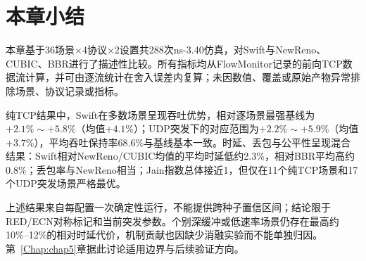 \section{本章小结}

本章基于36场景$\times$4协议$\times$2设置共288次ns-3.40仿真，对Swift与NewReno、CUBIC、BBR进行了描述性比较。所有指标均从FlowMonitor记录的前向TCP数据流计算，并可由逐流统计在舍入误差内复算；未因数值、覆盖或原始产物异常排除场景、协议记录或指标。

纯TCP结果中，Swift在多数场景呈现吞吐优势，相对逐场景最强基线为$+2.1\%\sim+5.8\%$（均值$+4.1\%$）；UDP突发下的对应范围为$+2.2\%\sim+5.9\%$（均值$+3.7\%$），平均吞吐保持率68.6\%与基线基本一致。时延、丢包与公平性呈现混合结果：Swift相对NewReno/CUBIC均值的平均时延低约2.3\%，相对BBR平均高约0.8\%；丢包率与NewReno相当；Jain指数总体接近1，但仅在11个纯TCP场景和17个UDP突发场景严格最优。

上述结果来自每配置一次确定性运行，不能提供跨种子置信区间；结论限于RED/ECN对称标记和当前突发参数。个别深缓冲或低速率场景仍存在最高约10\%--12\%的相对时延代价，机制贡献也因缺少消融实验而不能单独归因。第~\ref{Chap:chap5}章据此讨论适用边界与后续验证方向。

